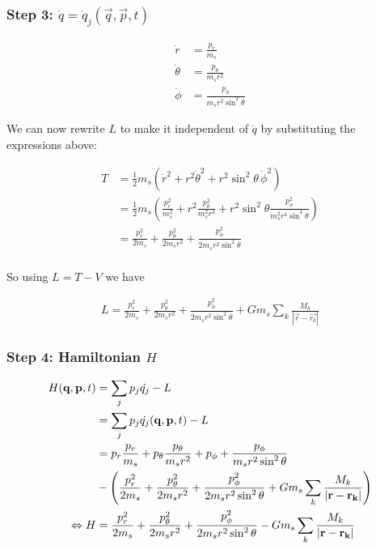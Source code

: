 \subsubsection{Step 3: \(\dot{q} = \dot{q}_j(\vec{q}, \vec{p}, t)\)}
\begin{align}
    \dot{r} &= \frac{p_r}{m_s} \\
    \dot{\theta} &= \frac{p_\theta}{m_s r^2} \\
    \dot{\phi} &= \frac{p_\phi}{m_s r^2 \sin^2{\theta}}
\end{align}

We can now rewrite \(L\) to make it independent of \(\dot{q}\) by substituting the expressions above:

\begin{align}
    T &= \frac{1}{2} m_s (\dot{r}^2 + r^2\dot{\theta}^2 + r^2\sin^2{\theta}\,\dot{\phi}^2) \\
    &= \frac{1}{2} m_s \left(\frac{p_r^2}{m_s^2} + r^2\frac{p_\theta^2}{m_s^2 r^4} + r^2\sin^2{\theta}\frac{p_\phi^2}{m_s^2 r^4 \sin^4{\theta}} \right) \\
    &= \frac{p_r^2}{2 m_s} + \frac{p_\theta^2}{2 m_s r^2} + \frac{p_\phi^2}{2 m_s r^2 \sin^2{\theta}} \\
\end{align}

So using \(L = T - V\) we have

\begin{align}
    L = \frac{p_r^2}{2 m_s} + \frac{p_\theta^2}{2 m_s r^2} + \frac{p_\phi^2}{2 m_s r^2 \sin^2{\theta}} + G m_s \sum\limits_{k} \frac{M_k}{\left| \vec{r} - \vec{r_k} \right|}
\end{align}

\subsubsection{Step 4: Hamiltonian \(H\)}
\begin{align}
    H(\vec{q}, \vec{p}, t) &= \sum\limits_{j}p_j \dot{q_j} - L \\
    &= \sum\limits_{j}p_j \dot{q_j}(\vec{q}, \vec{p}, t) - L \\
    &= p_r \frac{p_r}{m_s} + p_\theta \frac{p_\theta}{m_s r^2} + p_\phi + \frac{p_\phi}{m_s r^2 \sin^2{\theta}} \notag \\
    &- \left( \frac{p_r^2}{2 m_s} + \frac{p_\theta^2}{2 m_s r^2} + \frac{p_\phi^2}{2 m_s r^2 \sin^2{\theta}} + G m_s \sum\limits_{k} \frac{M_k}{\left| \vec{r} - \vec{r_k} \right|} \right) \\
    \Leftrightarrow H &= \frac{p_r^2}{2 m_s} + \frac{p_\theta^2}{2 m_s r^2} + \frac{p_\phi^2}{2 m_s r^2 \sin^2{\theta}} - G m_s \sum\limits_{k} \frac{M_k}{\left| \vec{r} - \vec{r_k} \right|}
\end{align}

